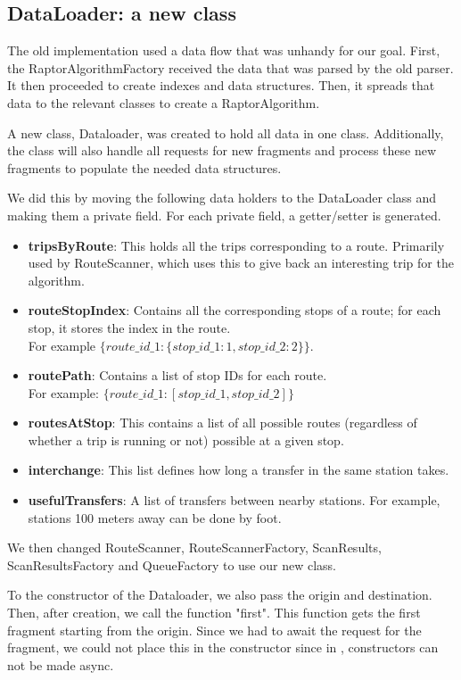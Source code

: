 \subsection{DataLoader: a new class}
The old implementation used a data flow that was unhandy for our goal. First, the RaptorAlgorithmFactory received the data that was parsed by the old parser. It then proceeded to create indexes and data structures. Then, it spreads that data to the relevant classes to create a RaptorAlgorithm.



A new class, Dataloader, was created to hold all data in one class. Additionally, the class will also handle all requests for new fragments and process these new fragments to populate the needed data structures.

We did this by moving the following data holders to the DataLoader class and making them a private field. For each private field, a getter/setter is generated.
\begin{itemize}
    \item \textbf{tripsByRoute}: This holds all the trips corresponding to a route. Primarily used by RouteScanner, which uses this to give back an interesting trip for the  algorithm.
    \item \textbf{routeStopIndex}: Contains all the corresponding stops of a route; for each stop, it stores the index in the route.\\ For example $\{route\_id\_1:\{stop\_id\_1:1,stop\_id\_2:2\}\}$.
    \item \textbf{routePath}: Contains a list of stop IDs for each route.\\ For example: $\{route\_id\_1:[stop\_id\_1,stop\_id\_2]\}$
    \item \textbf{routesAtStop}: This contains a list of all possible routes (regardless of whether a trip is running or not) possible at a given stop.
    \item \textbf{interchange}: This list defines how long a transfer in the same station takes.
    \item \textbf{usefulTransfers}: A list of transfers between nearby stations. For example, stations 100 meters away can be done by foot.
\end{itemize}

We then changed RouteScanner, RouteScannerFactory, ScanResults, ScanResultsFactory and QueueFactory to use our new class.

To the constructor of the Dataloader, we also pass the origin and destination. Then, after creation, we call the function "first". This function gets the first fragment starting from the origin. Since we had to await the request for the fragment, we could not place this in the constructor since in , constructors can not be made async.

